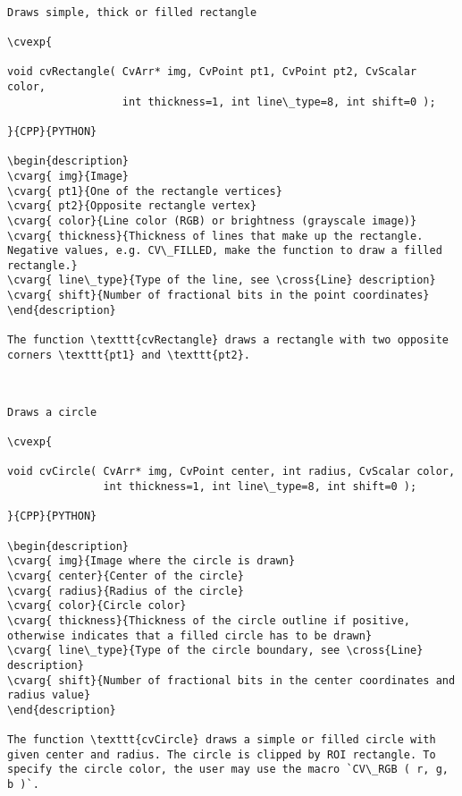 \begin{verbatim}

Draws simple, thick or filled rectangle

\cvexp{

void cvRectangle( CvArr* img, CvPoint pt1, CvPoint pt2, CvScalar color,
                  int thickness=1, int line\_type=8, int shift=0 );

}{CPP}{PYTHON}

\begin{description}
\cvarg{ img}{Image}
\cvarg{ pt1}{One of the rectangle vertices}
\cvarg{ pt2}{Opposite rectangle vertex}
\cvarg{ color}{Line color (RGB) or brightness (grayscale image)}
\cvarg{ thickness}{Thickness of lines that make up the rectangle. Negative values, e.g. CV\_FILLED, make the function to draw a filled rectangle.}
\cvarg{ line\_type}{Type of the line, see \cross{Line} description}
\cvarg{ shift}{Number of fractional bits in the point coordinates}
\end{description}

The function \texttt{cvRectangle} draws a rectangle with two opposite corners \texttt{pt1} and \texttt{pt2}.


\end{verbatim}
\begin{verbatim}

Draws a circle

\cvexp{

void cvCircle( CvArr* img, CvPoint center, int radius, CvScalar color,
               int thickness=1, int line\_type=8, int shift=0 );

}{CPP}{PYTHON}

\begin{description}
\cvarg{ img}{Image where the circle is drawn}
\cvarg{ center}{Center of the circle}
\cvarg{ radius}{Radius of the circle}
\cvarg{ color}{Circle color}
\cvarg{ thickness}{Thickness of the circle outline if positive, otherwise indicates that a filled circle has to be drawn}
\cvarg{ line\_type}{Type of the circle boundary, see \cross{Line} description}
\cvarg{ shift}{Number of fractional bits in the center coordinates and radius value}
\end{description}

The function \texttt{cvCircle} draws a simple or filled circle with given center and radius. The circle is clipped by ROI rectangle. To specify the circle color, the user may use the macro `CV\_RGB ( r, g, b )`.


\end{verbatim}
